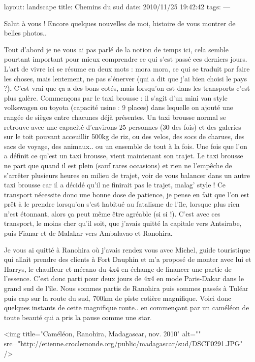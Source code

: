 layout: landscape
title: Chemins du sud
date: 2010/11/25 19:42:42
tags:
---

Salut à vous ! Encore quelques nouvelles de moi, histoire de vous montrer de belles photos..

Tout d'abord je ne vous ai pas parlé de la notion de temps ici, cela semble pourtant important pour mieux comprendre ce qui s'est passé ces derniers jours. L'art de vivre ici se résume en deux mots : mora mora, ce qui se traduit par faire les choses, mais lentement, ne pas s'énerver (qui a dit que j'ai bien choisi le pays ?). C'est vrai que ça a des bons cotés, mais lorsqu'on est dans les transports c'est plus galère. Commençons par le taxi brousse : il s'agit d'un mini van style volkswagen ou toyota (capacité usine : 9 places) dans lequelle on ajouté une rangée de sièges entre chacunes déjà présentes. Un taxi brousse normal se retrouve avec une capacité d'environs 25 personnes (30 des fois) et des galeries sur le toit pouvant acceuillir 500kg de riz, ou des velos, des socs de charues, des sacs de voyage, des animaux.. ou un ensemble de tout à la fois. Une fois que l'on a définit ce qu'est un taxi brousse, vient maintenant son trajet. Le taxi brousse ne part que quand il est plein (sauf rares occasions) et rien ne l'empêche de s'arrêter plusieurs heures en milieu de trajet, voir de vous balancer dans un autre taxi brousse car il a décidé qu'il ne finirait pas le trajet, malag' style ! Ce transport nécessite donc une bonne dose de patience, je pense en fait que l'on est prêt à le prendre lorsqu'on s'est habitué au fatalisme de l'île, lorsque plus rien n'est étonnant, alors ça peut même être agréable (si si !). C'est avec ces transport, le moins cher qu'il soit, que j'avais quitté la capitale vers Antsirabe, puis Fianar et de Malakar vers Ambalavao et Ranohira.

Je vous ai quitté à Ranohira où j'avais rendez vous avec Michel, guide touristique qui allait prendre des clients à Fort Dauphin et m'a proposé de monter avec lui et Harrys, le chauffeur et mécano du 4x4 en échange de financer une partie de l'essence. C'est donc parti pour deux jours de 4x4 en mode Paris-Dakar dans le grand sud de l'île. Nous sommes partis de Ranohira puis sommes passés à Tuléar puis cap sur la route du sud, 700km de piste cotière magnifique. Voici donc quelques instants de cette magnifique route.. en commençant par un caméléon de toute beauté qui a pris la pause comme une star.

<img title="Caméléon, Ranohira, Madagascar, nov. 2010" alt="" src="http://etienne.croclemonde.org/public/madagascar/sud/DSCF0291.JPG" />

